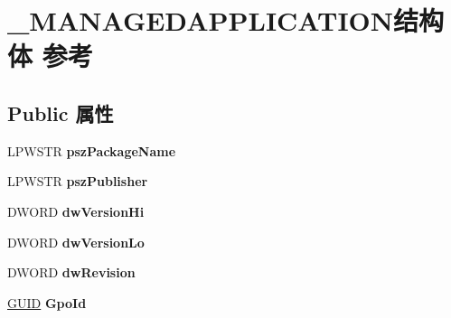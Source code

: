 \hypertarget{struct___m_a_n_a_g_e_d_a_p_p_l_i_c_a_t_i_o_n}{}\section{\+\_\+\+M\+A\+N\+A\+G\+E\+D\+A\+P\+P\+L\+I\+C\+A\+T\+I\+O\+N结构体 参考}
\label{struct___m_a_n_a_g_e_d_a_p_p_l_i_c_a_t_i_o_n}
\subsection*{Public 属性}
\begin{DoxyCompactItemize}
\item 
\mbox{\label{struct___m_a_n_a_g_e_d_a_p_p_l_i_c_a_t_i_o_n_ad3b5b5f74777762ed2602e1898e386c9}} 
L\+P\+W\+S\+TR {\bfseries psz\+Package\+Name}
\item 
\mbox{\label{struct___m_a_n_a_g_e_d_a_p_p_l_i_c_a_t_i_o_n_af9fbbf47948d743395a4e4a7324da496}} 
L\+P\+W\+S\+TR {\bfseries psz\+Publisher}
\item 
\mbox{\label{struct___m_a_n_a_g_e_d_a_p_p_l_i_c_a_t_i_o_n_a9761141e4a7466971e08a2ff334eb1a4}} 
D\+W\+O\+RD {\bfseries dw\+Version\+Hi}
\item 
\mbox{\label{struct___m_a_n_a_g_e_d_a_p_p_l_i_c_a_t_i_o_n_a358e8feb315fa66f5f074abac47488c2}} 
D\+W\+O\+RD {\bfseries dw\+Version\+Lo}
\item 
\mbox{\label{struct___m_a_n_a_g_e_d_a_p_p_l_i_c_a_t_i_o_n_a72cd7ed117ec4c286de102d449837d40}} 
D\+W\+O\+RD {\bfseries dw\+Revision}
\item 
\mbox{\label{struct___m_a_n_a_g_e_d_a_p_p_l_i_c_a_t_i_o_n_a819a7572449f5d008827bab8f9a32b31}} 
\hyperlink{interface_g_u_i_d}{G\+U\+ID} {\bfseries Gpo\+Id}
\item 
\mbox{\label{struct___m_a_n_a_g_e_d_a_p_p_l_i_c_a_t_i_o_n_acae8b27b47ec1c348e4432492779dcc4}} 

\end{DoxyCompactItemize}
